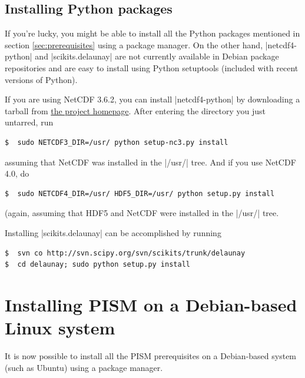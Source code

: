 \documentclass[11pt,final]{amsart}
\begin{document}
\subsection{Installing Python packages}
\label{sec:recommended}

If you're lucky, you might be able to install all the Python packages mentioned in section \ref{sec:prerequisites} using a package
manager. On the other hand, |netcdf4-python| and |scikits.delaunay| are not currently available in Debian package repositories and
are easy to install using Python setuptools (included with recent versions of Python).

If you are using NetCDF 3.6.2, you can install |netcdf4-python| by downloading a tarball from
\href{http://code.google.com/p/netcdf4-python/}{the project homepage}. After entering the directory you just untarred, run
\begin{verbatim}
$  sudo NETCDF3_DIR=/usr/ python setup-nc3.py install
\end{verbatim}
assuming that NetCDF was installed in the |/usr/| tree. And if you use NetCDF 4.0, do
\begin{verbatim}
$  sudo NETCDF4_DIR=/usr/ HDF5_DIR=/usr/ python setup.py install
\end{verbatim}
(again, assuming that HDF5 and NetCDF were installed in the |/usr/| tree.

\bigskip
Installing |scikits.delaunay| can be accomplished by running
\begin{verbatim}
$  svn co http://svn.scipy.org/svn/scikits/trunk/delaunay
$  cd delaunay; sudo python setup.py install
\end{verbatim}

\clearpage
\section{Installing PISM on a Debian-based Linux system}
\label{sec:debian}
It is now possible to install all the PISM prerequisites on a Debian-based system (such as Ubuntu) using a package manager.
\end{document}
